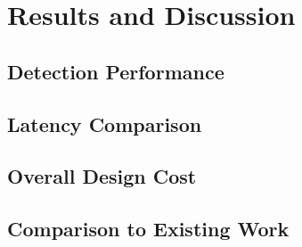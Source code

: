 \chapter{Results and Discussion \label{sec:results}}

\section{Detection Performance}
\section{Latency Comparison}
\section{Overall Design Cost}
\section{Comparison to Existing Work}

